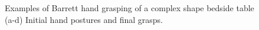\begin{figure}
    \hspace{0.005in}
    \hspace{0.005in}


\caption{  {Examples of Barrett hand grasping of a complex shape bedside table (a-d) Initial hand postures and final grasps. }}
\label{fig:result:bedside}
\end{figure}



